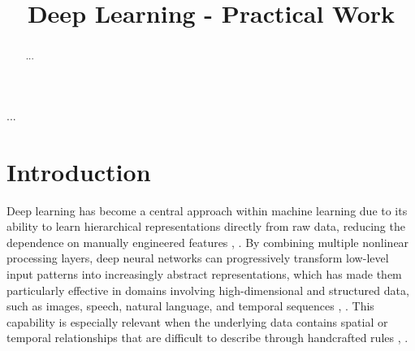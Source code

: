 \documentclass[conference]{IEEEtran}
\begin{document}
\title{Deep Learning - Practical Work}

\author{
}

\maketitle

\begin{abstract}
 ...
\end{abstract}

\begin{IEEEkeywords}
 ...
\end{IEEEkeywords}

\section{Introduction}

Deep learning has become a central approach within machine learning due to its ability to learn hierarchical representations directly from raw data, reducing the dependence on manually engineered features \cite{b1}, \cite{b2}. By combining multiple nonlinear processing layers, deep neural networks can progressively transform low-level input patterns into increasingly abstract representations, which has made them particularly effective in domains involving high-dimensional and structured data, such as images, speech, natural language, and temporal sequences \cite{b2}, \cite{b3}. This capability is especially relevant when the underlying data contains spatial or temporal relationships that are difficult to describe through handcrafted rules \cite{b1}, \cite{b4}.
\end{document}
